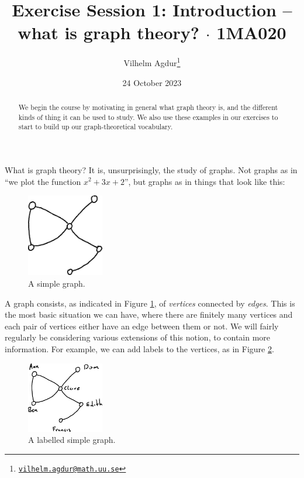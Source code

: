 \documentclass[nobib]{tufte-handout}
\title{Exercise Session 1: Introduction -- what is graph theory? $\cdot$ 1MA020}
\author[Vilhelm Agdur]{Vilhelm Agdur\thanks{\href{mailto:vilhelm.agdur@math.uu.se}{\nolinkurl{vilhelm.agdur@math.uu.se}}}}
\date{24 October 2023}
\begin{document}
\maketitle%

\begin{abstract}
\noindent
We begin the course by motivating in general what graph theory is, and the different kinds of thing it can be used to study. We also use these examples in our exercises to start to build up our graph-theoretical vocabulary.
\end{abstract}

What is graph theory? It is, unsurprisingly, the study of graphs. Not graphs as in ``we plot the function $x^2+3x+2$'', but graphs as in things that look like this:

\begin{figure}
  \centering
  \includegraphics[width=0.3\textwidth]{graphics/L1_exc/unlabeled_simple_graph.png}
  \caption{A simple graph.}
  \label{fig:simple_graph}
\end{figure}

A graph consists, as indicated in Figure \ref{fig:simple_graph}, of \emph{vertices} connected by \emph{edges}. This is the most basic situation we can have, where there are finitely many vertices and each pair of vertices either have an edge between them or not. We will fairly regularly be considering various extensions of this notion, to contain more information. For example, we can add labels to the vertices, as in Figure \ref{fig:labelled_simple_graph}.

\begin{figure}
  \centering
  \includegraphics[width=0.3\textwidth]{graphics/L1_exc/labeled_simple_graph.png}
  \caption{A labelled simple graph.}
  \label{fig:labelled_simple_graph}
\end{figure}
\end{document}
